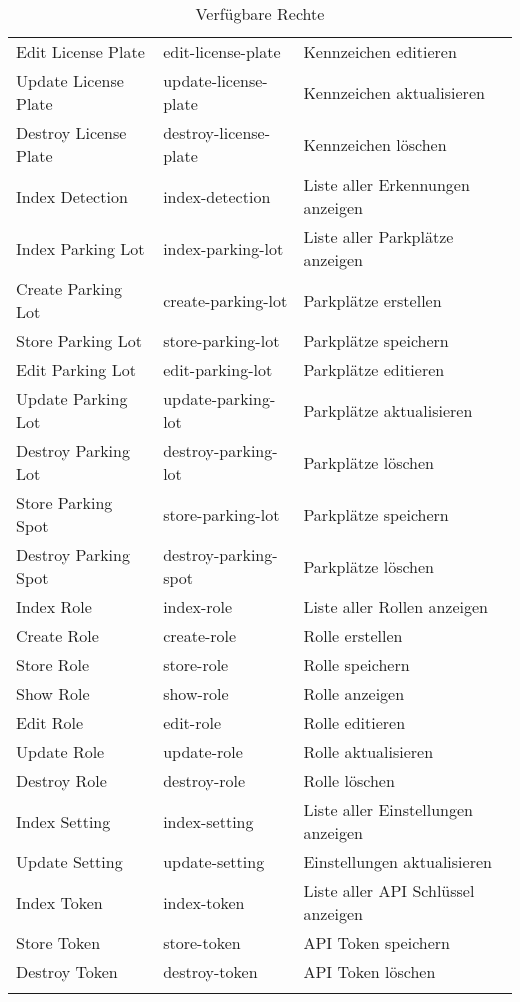 \begin{longtable}[c]{@{}lll@{}}
  Edit License Plate    & edit-license-plate    & Kennzeichen editieren              \\
  Update License Plate  & update-license-plate  & Kennzeichen aktualisieren          \\
  Destroy License Plate & destroy-license-plate & Kennzeichen löschen                \\
  Index Detection       & index-detection       & Liste aller Erkennungen anzeigen   \\
  Index Parking Lot     & index-parking-lot     & Liste aller Parkplätze anzeigen    \\
  Create Parking Lot    & create-parking-lot    & Parkplätze erstellen               \\
  Store Parking Lot     & store-parking-lot     & Parkplätze speichern               \\
  Edit Parking Lot      & edit-parking-lot      & Parkplätze editieren               \\
  Update Parking Lot    & update-parking-lot    & Parkplätze aktualisieren           \\
  Destroy Parking Lot   & destroy-parking-lot   & Parkplätze löschen                 \\
  Store Parking Spot    & store-parking-lot     & Parkplätze speichern               \\
  Destroy Parking Spot  & destroy-parking-spot  & Parkplätze löschen                 \\
  Index Role            & index-role            & Liste aller Rollen anzeigen        \\
  Create Role           & create-role           & Rolle erstellen                    \\
  Store Role            & store-role            & Rolle speichern                    \\
  Show Role             & show-role             & Rolle anzeigen                     \\
  Edit Role             & edit-role             & Rolle editieren                    \\
  Update Role           & update-role           & Rolle aktualisieren                \\
  Destroy Role          & destroy-role          & Rolle löschen                      \\
  Index Setting         & index-setting         & Liste aller Einstellungen anzeigen \\
  Update Setting        & update-setting        & Einstellungen aktualisieren        \\
  Index Token           & index-token           & Liste aller API Schlüssel anzeigen \\
  Store Token           & store-token           & API Token speichern                \\
  Destroy Token         & destroy-token         & API Token löschen                  \\* \bottomrule
  \caption{Verfügbare Rechte}
\end{longtable}

